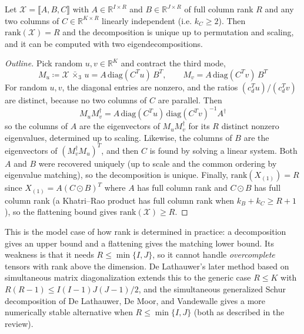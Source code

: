     \begin{theorem}
      \label{thm:jennrich}
      Let $\mathcal{X} = \llbracket A, B, C \rrbracket$ with $A \in \mathbb{R}^{I \times R}$ and $B \in \mathbb{R}^{J \times R}$ of full column rank $R$ and any two columns of $C \in \mathbb{R}^{K \times R}$ linearly independent (i.e. $k_C \geq 2$). Then $\mathrm{rank}(\mathcal{X}) = R$ and the decomposition is unique up to permutation and scaling, and it can be computed with two eigendecompositions.
    \end{theorem}
    \begin{proof}[Outline]
      Pick random $u, v \in \mathbb{R}^K$ and contract the third mode,
      \begin{equation}
        M_u \coloneqq \mathcal{X} \,\bar{\times}_3\, u = A \, \mathrm{diag}(C^T u) \, B^T, \qquad M_v = A \, \mathrm{diag}(C^T v) \, B^T
      \end{equation}
      For random $u, v$, the diagonal entries are nonzero, and the ratios $(c_d^T u)/(c_d^T v)$ are distinct, because no two columns of $C$ are parallel. Then
      \begin{equation}
        M_u M_v^\dagger = A \, \mathrm{diag}(C^T u) \, \mathrm{diag}(C^T v)^{-1} A^\dagger
      \end{equation}
      so the columns of $A$ are the eigenvectors of $M_u M_v^\dagger$ for its $R$ distinct nonzero eigenvalues, determined up to scaling. Likewise, the columns of $B$ are the eigenvectors of $(M_v^\dagger M_u)^T$, and then $C$ is found by solving a linear system. Both $A$ and $B$ were recovered uniquely (up to scale and the common ordering by eigenvalue matching), so the decomposition is unique. Finally, $\mathrm{rank}(X_{(1)}) = R$ since $X_{(1)} = A(C \odot B)^T$ where $A$ has full column rank and $C \odot B$ has full column rank (a Khatri--Rao product has full column rank when $k_B + k_C \geq R + 1$), so the flattening bound gives $\mathrm{rank}(\mathcal{X}) \geq R$.
    \end{proof}

    This is the model case of how rank is determined in practice: a decomposition gives an upper bound and a flattening gives the matching lower bound. Its weakness is that it needs $R \leq \min\{I, J\}$, so it cannot handle \textit{overcomplete} tensors with rank above the dimension. De Lathauwer's later method based on simultaneous matrix diagonalization extends this to the generic case $R \leq K$ with $R(R-1) \leq I(I-1)J(J-1)/2$, and the simultaneous generalized Schur decomposition of De Lathauwer, De Moor, and Vandewalle gives a more numerically stable alternative when $R \leq \min\{I, J\}$ (both as described in the review).

